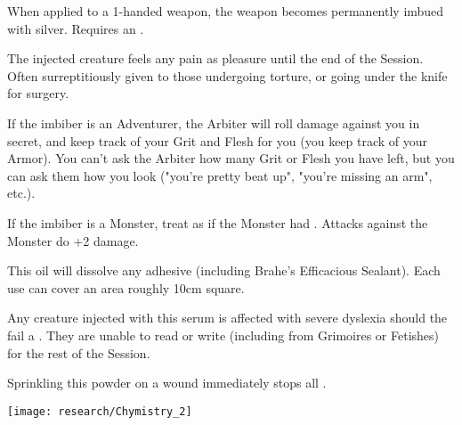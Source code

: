   When applied to a 1-handed weapon, the weapon becomes permanently imbued with silver. Requires an .


  \CHYMISTRY[
    Name=Wallace's Anesthetic,
    Link=chymistry-davys-soothing-anesthetic,
    Type=Sera,
    Pips=5,
    Time=Days
  ]

  The injected creature feels any pain as pleasure until the end of the Session. Often surreptitiously given to those undergoing torture, or going under the knife for surgery. 

If the imbiber is an Adventurer, the Arbiter will roll damage against you in secret, and keep track of your Grit and Flesh for you (you keep track of your Armor). You can't ask the Arbiter how many Grit or Flesh you have left, but you can ask them how you look ("you're pretty beat up", "you're missing an arm", etc.).

If the imbiber is a Monster, treat as if the Monster had . Attacks against the Monster do +2 damage.


  \CHYMISTRY[
    Name=Wei Boyang's Alkahest,
    Link=chymistry-wei-boyangs-alkahest,
    Type=Unguent,
    Pips=5,
    Time=Weeks
  ]

  This oil will dissolve any adhesive (including Brahe's Efficacious Sealant).  Each use can cover an area roughly 10cm square.


  \CHYMISTRY[
    Name=Wordwarp,
    Link=chymistry-wordwarp,
    Type=Sera,
    Pips=5,
    Time=Weeks
  ]

  Any creature injected with this serum is affected with severe dyslexia should the fail a . They are unable to read or write (including from Grimoires or Fetishes) for the rest of the Session.


  \CHYMISTRY[
    Name=Woundseal,
    Link=chymistry-woundseal,
    Type=Powder,
    Pips=2,
    Time=Days
  ]


  Sprinkling this powder on a wound immediately stops all .

  \begin{center}
    \texttt{[image: research/Chymistry\_2]}
  \end{center}




